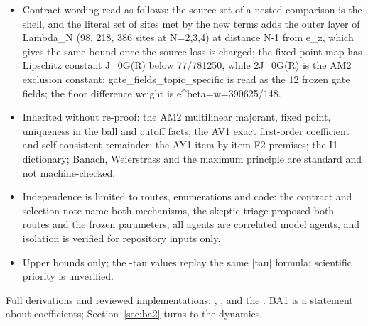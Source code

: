 \begin{gatequote}
\begin{itemize}
two-step union 49/55895184, both above 1/2000000; the forward telescoped
constant 2734375/12204185915601 and its union constant are valid labelled
values; the face sets are totally ordered (F1\_N inside F2\_N inside
F1\_(N+1)), so one nested comparison suffices for any pair of centered boxes.
\item Contract wording read as follows: the source set of a nested comparison
is the shell, and the literal set of sites met by the new terms adds the outer
layer of Lambda\_N (98, 218, 386 sites at N=2,3,4) at distance N-1 from e\_z,
which gives the same bound once the source loss is charged; the fixed-point
map has Lipschitz constant J\_0G\textquotesingle{}(R) below 77/781250, while
2J\_0G\textquotesingle{}(R) is the AM2 exclusion constant;
gate\_fields\_topic\_specific is read as the 12 frozen gate fields; the floor
difference weight is e\textasciicircum{}beta=w=390625/148.
\item Inherited without re-proof: the AM2 multilinear majorant, fixed point,
uniqueness in the ball and cutoff facts; the AV1 exact first-order coefficient
and self-consistent remainder; the AY1 item-by-item F2 premises; the I1
dictionary; Banach, Weierstrass and the maximum principle are standard and not
machine-checked.
\item Independence is limited to routes, enumerations and code: the contract
and selection note name both mechanisms, the skeptic triage proposed both
routes and the frozen parameters, all agents are correlated model agents, and
isolation is verified for repository inputs only.
\item Upper bounds only; the -tau values replay the same |tau| formula;
scientific priority is unverified.
\end{itemize}
\end{gatequote}
Full derivations and reviewed implementations:
,
,
 and
the . BA1 is a
statement about coefficients; Section~\ref{sec:ba2} turns to the dynamics.
